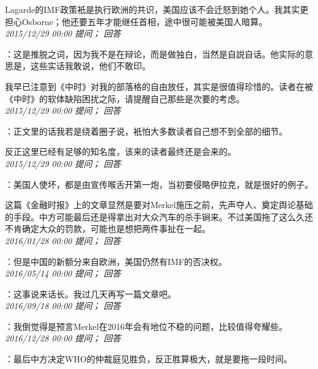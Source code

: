 \documentclass[twocolumn]{ctexart}
\begin{document}
Lagarde的IMF政策衹是执行欧洲的共识，美国应该不会迁怒到她个人。我其实更担心Osborne；他还要五年才能继任首相，途中很可能被美国人暗算。\\

\textit{\hfill\noindent\small 2015/12/29 00:00 提问； 回答}

：这是推脱之词，因为我不是在辩论，而是做独白，当然是自説自话。他实际的意思是，这些实话我敢说，他们不敢印。

我早已注意到《中时》对我的部落格的自由放任，其实是很值得珍惜的。读者在被《中时》的软体缺陷困扰之际，请提醒自己那些是次要的考虑。\\

\textit{\hfill\noindent\small 2015/12/29 00:00 提问； 回答}

：正文里的话我若是绕着圈子说，衹怕大多数读者自己想不到全部的细节。

反正这里已经有足够的知名度，该来的读者最终还是会来的。\\

\textit{\hfill\noindent\small 2015/12/29 00:00 提问； 回答}

：美国人使坏，都是由宣传喉舌开第一炮，当初要侵略伊拉克，就是很好的例子。

这篇《金融时报》上的文章显然是要对Merkel施压之前，先声夺人、奠定舆论基础的手段。中方可能最后还是得拿出对大众汽车的杀手锏来。不过美国拖了这么久还不肯确定大众的罚款，可能也是想把两件事扯在一起。\\

\textit{\hfill\noindent\small 2016/01/28 00:00 提问； 回答}

：但是中国的新额分来自欧洲，美国仍然有IMF的否决权。\\

\textit{\hfill\noindent\small 2016/05/14 00:00 提问； 回答}

：这事说来话长。我过几天再写一篇文章吧。\\

\textit{\hfill\noindent\small 2016/09/18 00:00 提问； 回答}

：我倒觉得是预言Merkel在2016年会有地位不稳的问题，比较值得夸耀些。\\

\textit{\hfill\noindent\small 2016/12/28 00:00 提问； 回答}

：最后中方决定WHO的仲裁庭见胜负，反正胜算极大，就是要拖一段时间。\\
\end{document}
